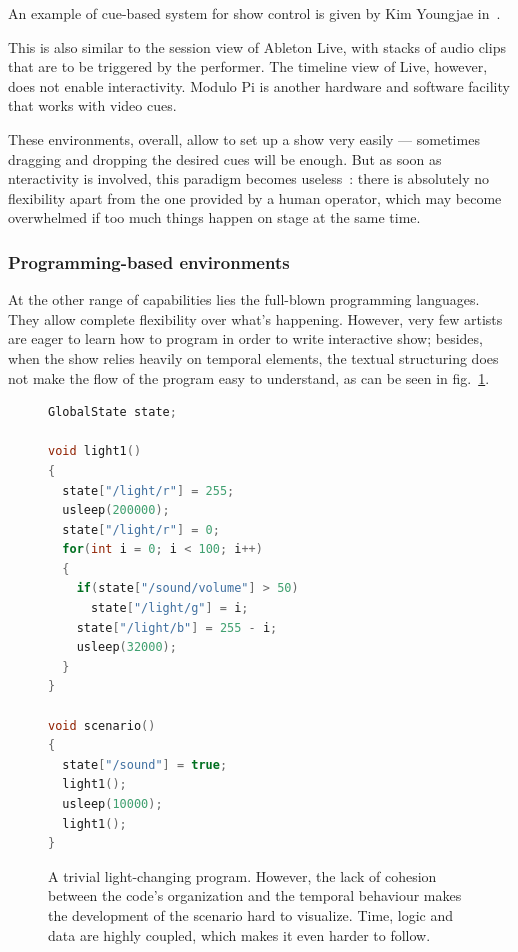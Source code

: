 \documentclass{sigchi}
\begin{document}
An example of cue-based system for show control is given by Kim Youngjae in~\cite{kim_unified_2013}. 

This is also similar to the session view of Ableton Live, with stacks of audio clips that are to be triggered by the performer. The timeline view of Live, however, does not enable interactivity. Modulo Pi is another hardware and software facility that works with video cues.

These environments, overall, allow to set up a show very easily --- sometimes dragging and dropping the desired cues will be enough. But as soon as nteractivity is involved, this paradigm becomes useless~: there is absolutely no flexibility apart from the one provided by a human operator, which may become overwhelmed if too much things happen on stage at the same time.

\subsubsection{Programming-based environments}
At the other range of capabilities lies the full-blown programming languages. They allow complete flexibility over what's happening. However, very few artists are eager to learn how to program in order to write interactive show; besides, when the show relies heavily on temporal elements, the textual structuring does not make the flow of the program easy to understand, as can be seen in fig.~\ref{fig.hardtofollow}.

\begin{figure}[h]
\begin{lstlisting}[language=c++]
GlobalState state;

void light1()
{
  state["/light/r"] = 255;
  usleep(200000);    
  state["/light/r"] = 0;
  for(int i = 0; i < 100; i++)
  {
    if(state["/sound/volume"] > 50)
      state["/light/g"] = i;        
    state["/light/b"] = 255 - i;
    usleep(32000);
  }
}

void scenario()
{
  state["/sound"] = true;
  light1();
  usleep(10000);
  light1();
}
\end{lstlisting}
\caption{A trivial light-changing program. However, the lack of cohesion between the code's organization and the temporal behaviour makes the development of the scenario hard to visualize. Time, logic and data are highly coupled, which makes it even harder to follow.}
\label{fig.hardtofollow}
\end{figure}
\end{document}
